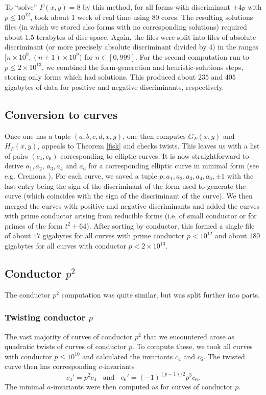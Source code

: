 To ``solve'' $F(x,y)=8$ by this method,  for all forms with discriminant $\pm 4p$ with $p\leq 10^{12}$, took about 1 
week of real time using 80 cores. The resulting solutions files (in which we stored also  forms with no corresponding 
solutions) required about 1.5 terabytes of disc space. Again, the files were split into files of absolute discriminant 
(or more precisely absolute discriminant divided by 4) in the ranges $[n \times 10^9, (n+1)\times 10^9)$ for 
$n\in[0,999]$. For the second computation run to $p \leq 2\times 10^{13}$, we combined the form-generation and 
heuristic-solutions steps, storing only forms which had solutions. This produced about $235$ and $405$ gigabytes of 
data for positive and negative discriminants, respectively. 

\subsection{Conversion to curves}
Once one has a tuple $(a,b,c,d,x,y)$, one then computes $G_F(x,y)$ and $H_F(x,y)$, appeals to Theorem \ref{fisk} and 
checks twists. This leaves us with a list of pairs $(c_4,c_6)$ corresponding to elliptic curves. It is now 
straightforward to derive $a_1,a_2$, $a_3,a_4$ and $a_6$ for a corresponding elliptic curve in minimal form (see e.g. 
Cremona \cite{Cre2}).  For each curve, we saved a tuple $p,a_1,a_2,a_3,a_4,a_6,\pm1$ with the last entry being the sign 
of the discriminant of the form used to generate the curve (which coincides with the sign of the discriminant of the 
curve). We then merged the curves with positive and negative discriminants and added the curves with prime conductor 
arising from reducible forms (i.e. of small conductor or for primes of the form $t^2+64$). After sorting by conductor, 
this formed a single file of about $17$ gigabytes for all curves with prime conductor $p < 10^{12}$ and about $180$ 
gigabytes for all curves with conductor $p<2\times10^{13}$.


\subsection{Conductor $p^2$}
The conductor $p^2$ computation was quite similar, but was split further into parts. 
\subsubsection{Twisting conductor $p$}
The vast majority of curves of conductor $p^2$ that we encountered arose as quadratic twists of curves of conductor 
$p$. To compute these, we took all curves with conductor $p \leq 10^{10}$ and calculated the invariants 
$c_4$ and $c_6$. The twisted curve then has corresponding $c$-invariants
$$
  c_4' = p^2 c_4  \; \; \mbox{ and } \; \;  c_6' = (-1)^{(p-1)/2}  p^3 c_6.
$$
The minimal $a$-invariants were then computed as for curves of 
conductor $p$. 

